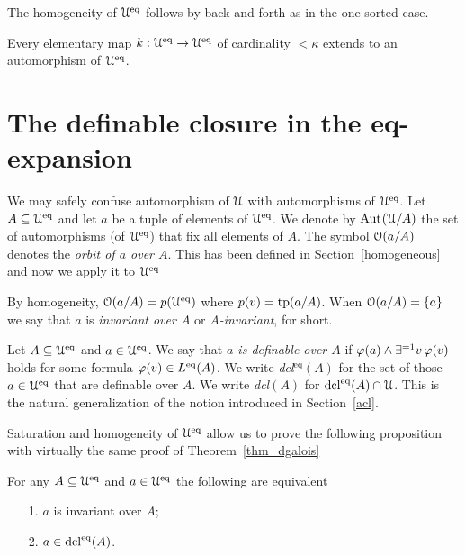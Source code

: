 \documentclass[creche.tex]{subfiles}
\begin{document}
The homogeneity of $\EuScript U^{{\rm eq}}$ follows by back-and-forth as in the one-sorted case.

\begin{proposition}\label{prop_Ueq_homogeneous}
Every elementary map $k:\EuScript U^{{\rm eq}}\to\EuScript U^{{\rm eq}}$ of cardinality $<\kappa$ extends to an automorphism of $\EuScript U^{{\rm eq}}$.\QED
\end{proposition} 




\section{The definable closure in the eq-expansion}
We may safely confuse automorphism of $\EuScript U$ with automorphisms of $\EuScript U^{{\rm eq}}$. Let $A\subseteq\EuScript U^{{\rm eq}}$ and let $a$ be a tuple of elements of $\EuScript U^{{{\rm eq}}}$. We denote by \emph{$\textrm{Aut\kern.15ex}(\EuScript U/A)$\/} the set of automorphisms (of $\EuScript U^{{\rm eq}}$) that fix all elements of $A$. The symbol \emph{$\EuScript O(a/A)$\/} denotes the \emph{orbit of $a$ over $A$}. This has been defined in Section~\ref{homogeneous} and now we apply it to $\EuScript U^{{\rm eq}}$


By homogeneity, $\EuScript O(a/A)=p(\EuScript U^{{\rm eq}})$ where $p(v)={\rm tp}(a/A)$. When $\EuScript O(a/A)=\{a\}$ we say that $a$ is \emph{invariant over $A$\/}
 or \emph{$A$-invariant}, for short.


\begin{definition}\label{def_def}
Let $A\subseteq\EuScript U^{{\rm eq}}$ and $a\in\EuScript U^{{\rm eq}}$. We say that \emph{$a$ is definable over $A$\/} if $\varphi(a)\wedge\exists^{=1}v\,\varphi(v)$ holds for some formula $\varphi(v)\in L^{{\rm eq}}(A)$. We write \emph{dcl$^\textrm{eq}(A)$\/} for the set of those $a\in\EuScript U^{{\rm eq}}$ that are definable over $A$. We write \emph{dcl$(A)$\/} for $\mathop{\rm dcl}^{{\rm eq}}(A)\cap\EuScript U$. This is the natural generalization of the notion introduced in Section~\ref{acl}.
\end{definition}

Saturation and homogeneity of $\EuScript U^{{\rm eq}}$ allow us to prove the following proposition with virtually the same proof of Theorem~\ref{thm_dgalois}

\begin{theorem}\label{thm_Galois_def=def}
For any $A\subseteq\EuScript U^{{\rm eq}}$ and $a\in\EuScript U^{{\rm eq}}$ the following are equivalent
\begin{itemize}
\item[1.] $a$ is invariant over $A$;
\item[2.] $a\in\mathop{\rm dcl}^{{\rm eq}}(A)$.\QED
\end{itemize}
\end{theorem}
\end{document}
